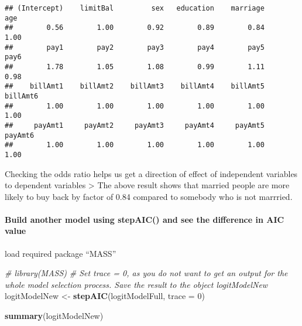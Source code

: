 \documentclass[
]{article}
\newenvironment{Shaded}{\begin{snugshade}}{\end{snugshade}}
\newcommand{\CommentTok}[1]{\textcolor[rgb]{0.56,0.35,0.01}{\textit{#1}}}
\newcommand{\DataTypeTok}[1]{\textcolor[rgb]{0.13,0.29,0.53}{#1}}
\newcommand{\DecValTok}[1]{\textcolor[rgb]{0.00,0.00,0.81}{#1}}
\newcommand{\KeywordTok}[1]{\textcolor[rgb]{0.13,0.29,0.53}{\textbf{#1}}}
\newcommand{\NormalTok}[1]{#1}
\newcommand{\OperatorTok}[1]{\textcolor[rgb]{0.81,0.36,0.00}{\textbf{#1}}}
\newcommand{\StringTok}[1]{\textcolor[rgb]{0.31,0.60,0.02}{#1}}
\begin{document}
\begin{Shaded}
\end{Shaded}

\begin{verbatim}
## (Intercept)    limitBal         sex   education    marriage         age 
##        0.56        1.00        0.92        0.89        0.84        1.00 
##        pay1        pay2        pay3        pay4        pay5        pay6 
##        1.78        1.05        1.08        0.99        1.11        0.98 
##    billAmt1    billAmt2    billAmt3    billAmt4    billAmt5    billAmt6 
##        1.00        1.00        1.00        1.00        1.00        1.00 
##     payAmt1     payAmt2     payAmt3     payAmt4     payAmt5     payAmt6 
##        1.00        1.00        1.00        1.00        1.00        1.00
\end{verbatim}

Checking the odds ratio helps us get a direction of effect of
independent variables to dependent variables \textgreater{} The above
result shows that married people are more likely to buy back by factor
of 0.84 compared to somebody who is not marrried.

\hypertarget{build-another-model-using-stepaic-and-see-the-difference-in-aic-value}{%
\paragraph{Build another model using stepAIC() and see the difference in
AIC
value}\label{build-another-model-using-stepaic-and-see-the-difference-in-aic-value}}

load required package ``MASS''

\begin{Shaded}
\begin{Highlighting}[]
\CommentTok{# library(MASS)}
\CommentTok{# Set trace = 0, as you do not want to get an output for the whole model selection process. Save the result to the object logitModelNew}
\NormalTok{logitModelNew <-}\StringTok{ }\KeywordTok{stepAIC}\NormalTok{(logitModelFull, }\DataTypeTok{trace =} \DecValTok{0}\NormalTok{)}

\KeywordTok{summary}\NormalTok{(logitModelNew)}
\end{Highlighting}
\end{Shaded}
\end{document}
